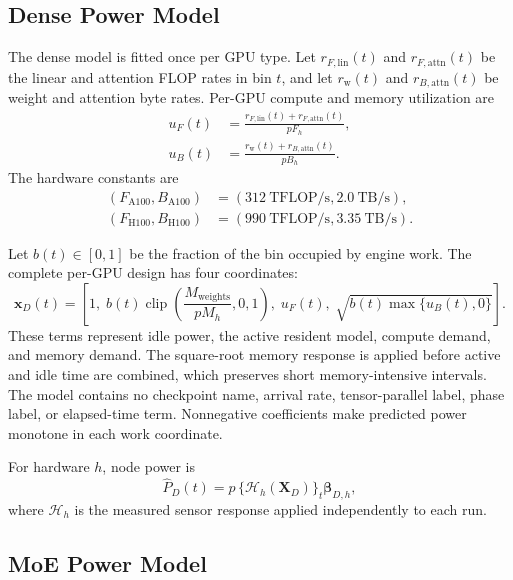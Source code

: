\subsection{Dense Power Model}
\label{sec:dense-power}

The dense model is fitted once per GPU type.  Let
$r_{F,\mathrm{lin}}(t)$ and $r_{F,\mathrm{attn}}(t)$ be the linear and
attention FLOP rates in bin $t$, and let $r_{\mathrm{w}}(t)$ and
$r_{B,\mathrm{attn}}(t)$ be weight and attention byte rates.  Per-GPU
compute and memory utilization are
\begin{align}
  u_F(t)&=\frac{r_{F,\mathrm{lin}}(t)+r_{F,\mathrm{attn}}(t)}{pF_h},\\
  u_B(t)&=\frac{r_{\mathrm{w}}(t)+r_{B,\mathrm{attn}}(t)}{pB_h}.
  \label{eq:dense-utilization}
\end{align}
The hardware constants are
\begin{align}
  (F_{\mathrm{A100}},B_{\mathrm{A100}})
    &=(312\ \mathrm{TFLOP/s},2.0\ \mathrm{TB/s}),\\
  (F_{\mathrm{H100}},B_{\mathrm{H100}})
    &=(990\ \mathrm{TFLOP/s},3.35\ \mathrm{TB/s}).
\end{align}

Let $b(t)\in[0,1]$ be the fraction of the bin occupied by engine work.  The
complete per-GPU design has four coordinates:
\begin{equation}
  \mathbf{x}_D(t)=\left[
  1,\;
  b(t)\operatorname{clip}\!\left(
    \frac{M_{\mathrm{weights}}}{pM_h},0,1\right),\;
  u_F(t),\;
  \sqrt{b(t)\max\{u_B(t),0\}}
  \right].
  \label{eq:dense-design}
\end{equation}
These terms represent idle power, the active resident model, compute demand,
and memory demand.  The square-root memory response is applied before active
and idle time are combined, which preserves short memory-intensive intervals.
The model contains no checkpoint name, arrival rate, tensor-parallel label,
phase label, or elapsed-time term.  Nonnegative coefficients make predicted
power monotone in each work coordinate.

For hardware $h$, node power is
\begin{equation}
  \widehat P_D(t)=p\,
  \{\mathcal H_h(\mathbf X_D)\}_t\boldsymbol\beta_{D,h},
\end{equation}
where $\mathcal H_h$ is the measured sensor response applied independently to
each run.

\subsection{MoE Power Model}
\label{sec:moe-power}


